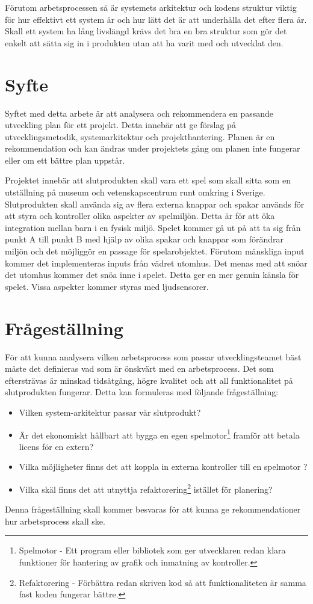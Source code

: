 \documentclass[a4paper,12pt,oneside,final]{extbook}
\begin{document}
Förutom arbetsprocessen så är systemets arkitektur och kodens struktur viktig för hur effektivt ett system är och hur lätt det är att underhålla det efter flera år. Skall ett system ha lång livslängd krävs det bra en bra struktur som gör det enkelt att sätta sig in i produkten utan att ha varit med och utvecklat den.
\section{Syfte}

Syftet med detta arbete är att analysera och rekommendera en passande utveckling plan för ett projekt. Detta innebär att ge förslag på utvecklingsmetodik, systemarkitektur och projekthantering. Planen är en rekommendation och kan ändras under projektets gång om planen inte fungerar eller om ett bättre plan uppstår. 

Projektet innebär att slutprodukten skall vara ett spel som skall sitta som en utställning på museum och vetenskapscentrum runt omkring i Sverige. Slutprodukten skall använda sig av flera externa knappar och spakar används för att styra och kontroller olika aspekter av spelmiljön. Detta är för att öka integration mellan barn i en fysisk miljö. Spelet kommer gå ut på att ta sig från punkt A till punkt B med hjälp av olika spakar och knappar som förändrar miljön och det möjliggör en passage för spelarobjektet. Förutom mänskliga input kommer det implementeras inputs från vädret utomhus. Det menas med att snöar det utomhus kommer det snöa inne i spelet. Detta ger en mer genuin känsla för spelet. Vissa aspekter kommer styras med ljudsensorer.


\section{Frågeställning}
För att kunna analysera vilken arbetsprocess som passar utvecklingsteamet bäst måste det definieras vad som är önskvärt med en arbetsprocess. Det som eftersträvas är minskad tidsåtgång, högre kvalitet och att all funktionalitet på slutprodukten fungerar. Detta kan formuleras med följande frågeställning: 
\begin{itemize}
	\item Vilken system-arkitektur passar vår slutprodukt? 
	\item Är det ekonomiskt hållbart att bygga en egen spelmotor\footnote{Spelmotor - Ett program eller bibliotek som ger utvecklaren redan klara funktioner för hantering av grafik och inmatning av kontroller.} framför att betala licens för en extern?
	\item Vilka möjligheter finns det att koppla in externa kontroller till en spelmotor ?
	\item Vilka skäl finns det att utnyttja refaktorering\footnote{Refaktorering - Förbättra redan skriven kod så att funktionaliteten är samma fast koden fungerar bättre\cite{Fowler2000rit}.} istället för planering?

\end{itemize}
Denna frågeställning skall kommer besvaras för att kunna ge rekommendationer hur arbetsprocess skall ske.
\end{document}

